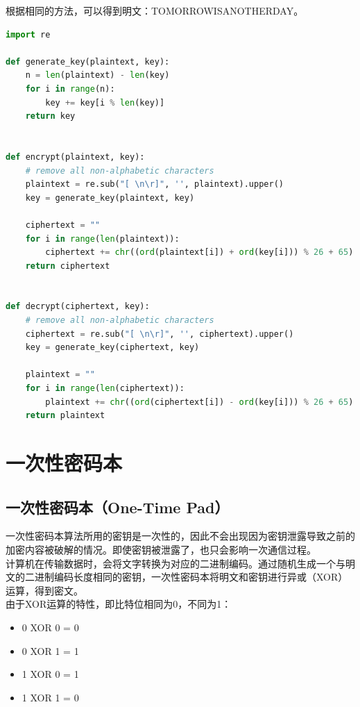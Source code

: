 根据相同的方法，可以得到明文：TOMORROWISANOTHERDAY。\\


\begin{lstlisting}[language=Python]
import re

def generate_key(plaintext, key):
    n = len(plaintext) - len(key)
    for i in range(n): 
        key += key[i % len(key)]
    return key


def encrypt(plaintext, key):
    # remove all non-alphabetic characters
    plaintext = re.sub("[ \n\r]", '', plaintext).upper()
    key = generate_key(plaintext, key)

    ciphertext = ""
    for i in range(len(plaintext)):
        ciphertext += chr((ord(plaintext[i]) + ord(key[i])) % 26 + 65)
    return ciphertext


def decrypt(ciphertext, key):
    # remove all non-alphabetic characters
    ciphertext = re.sub("[ \n\r]", '', ciphertext).upper()
    key = generate_key(ciphertext, key)

    plaintext = ""
    for i in range(len(ciphertext)):
        plaintext += chr((ord(ciphertext[i]) - ord(key[i])) % 26 + 65)
    return plaintext
\end{lstlisting}

\newpage

\section{一次性密码本}

\subsection{一次性密码本（One-Time Pad）}

一次性密码本算法所用的密钥是一次性的，因此不会出现因为密钥泄露导致之前的加密内容被破解的情况。即使密钥被泄露了，也只会影响一次通信过程。\\

计算机在传输数据时，会将文字转换为对应的二进制编码。通过随机生成一个与明文的二进制编码长度相同的密钥，一次性密码本将明文和密钥进行异或（XOR）运算，得到密文。\\

由于XOR运算的特性，即比特位相同为0，不同为1：

\begin{itemize}
    \item 0 XOR 0 = 0
    \item 0 XOR 1 = 1
    \item 1 XOR 0 = 1
    \item 1 XOR 1 = 0
\end{itemize}

